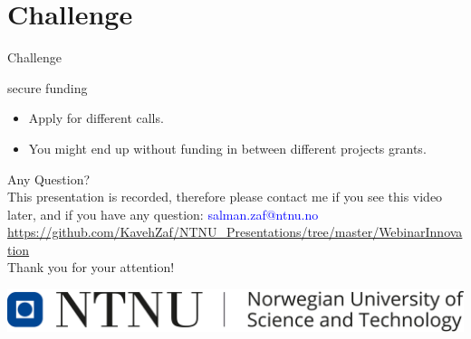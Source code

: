 \documentclass[12pt]{beamer}
\begin{document}
\section{Challenge}
\begin{frame}{Challenge}
\begin{alertblock}{secure funding}
\begin{itemize}
\item Apply for different calls.
\item You might end up without funding in between different projects grants. 
\end{itemize}

\end{alertblock}
\end{frame}
\begin{frame}
\centering
Any Question?\\
This presentation is recorded, therefore please contact me if you see this video later, and if you have any question: \textcolor{blue}{salman.zaf@ntnu.no}\\
\textcolor{blue}{\tiny \url{https://github.com/KavehZaf/NTNU_Presentations/tree/master/WebinarInnovation}}\\
Thank you for your attention!\\
		\vskip 0.8cm

\centering
\includegraphics[scale=0.2]{ntnulogo_eng.png}
\end{frame} 
\end{document}
